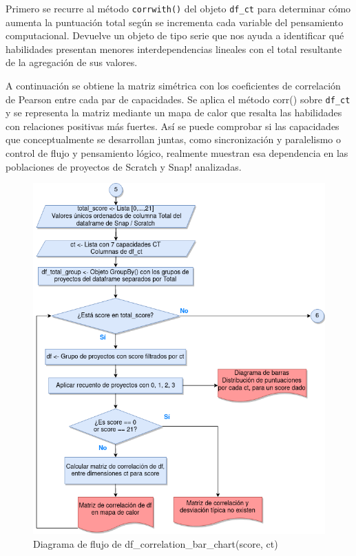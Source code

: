 \documentclass[a4paper, 12pt]{book}
\begin{document}
Primero se recurre al método \texttt{corrwith()} del objeto \texttt{df\_ct} para determinar cómo aumenta la puntuación total según se incrementa cada variable del pensamiento computacional. Devuelve un objeto de tipo serie que nos ayuda a identificar qué habilidades presentan menores interdependencias lineales con el total resultante de la agregación de sus valores.

A continuación se obtiene la matriz simétrica con los coeficientes de correlación de Pearson entre cada par de capacidades. Se aplica el método corr() sobre \texttt{df\_ct} y se representa la matriz mediante un mapa de calor que resalta las habilidades con relaciones positivas más fuertes. Así se puede comprobar si las capacidades que conceptualmente se desarrollan juntas, como sincronización y paralelismo o control de flujo y pensamiento lógico, realmente muestran esa dependencia en las poblaciones de  proyectos de Scratch y Snap! analizadas.

\begin{figure}[H]
    \centering
    \includegraphics[height=.5\textheight]{img/diagrama_corr2.png}
    \caption{Diagrama de flujo de df\_correlation\_bar\_chart(score, ct)}\label{fig:diagrama_corr}
\end{figure}
\end{document}
